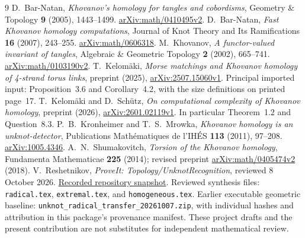 \documentclass[11pt,letterpaper]{article}
\theoremstyle{remark}\newtheorem{remark}[theorem]{Remark}
\begin{document}
\begin{thebibliography}{9}
 D.~Bar-Natan, \emph{Khovanov's homology for tangles and cobordisms}, Geometry \& Topology \textbf{9} (2005), 1443--1499. \href{https://arxiv.org/abs/math/0410495v2}{arXiv:math/0410495v2}.
 D.~Bar-Natan, \emph{Fast Khovanov homology computations}, Journal of Knot Theory and Its Ramifications \textbf{16} (2007), 243--255. \href{https://arxiv.org/abs/math/0606318}{arXiv:math/0606318}.
 M.~Khovanov, \emph{A functor-valued invariant of tangles}, Algebraic \& Geometric Topology \textbf{2} (2002), 665--741. \href{https://arxiv.org/abs/math/0103190v2}{arXiv:math/0103190v2}.
 T.~Kelom\"aki, \emph{Morse matchings and Khovanov homology of 4-strand torus links}, preprint (2025), \href{https://arxiv.org/abs/2507.15060v1}{arXiv:2507.15060v1}. Principal imported input: Proposition~3.6 and Corollary~4.2, with the size definitions on printed page~17.
 T.~Kelom\"aki and D.~Sch\"utz, \emph{On computational complexity of Khovanov homology}, preprint (2026), \href{https://arxiv.org/abs/2601.02119v1}{arXiv:2601.02119v1}. In particular Theorem~1.2 and Question~8.3.
 P.~B.~Kronheimer and T.~S.~Mrowka, \emph{Khovanov homology is an unknot-detector}, Publications Math\'ematiques de l'IH\'ES \textbf{113} (2011), 97--208. \href{https://arxiv.org/abs/1005.4346}{arXiv:1005.4346}.
 A.~N.~Shumakovitch, \emph{Torsion of the Khovanov homology}, Fundamenta Mathematicae \textbf{225} (2014); revised preprint \href{https://arxiv.org/abs/math/0405474v2}{arXiv:math/0405474v2} (2018).
 V.~Reshetnikov, \emph{ProveIt: Topology/UnknotRecognition}, reviewed 8 October 2026. \href{https://github.com/VladimirReshetnikov/ProveIt/tree/ca4681932655c2898d3ea65611bb74ba988b87d0/Topology/UnknotRecognition}{Recorded repository snapshot}. Reviewed synthesis files: \texttt{radical.tex}, \texttt{extremal.tex}, and \texttt{homogeneous.tex}. Earlier executable geometric baseline: \texttt{unknot\_radical\_transfer\_20261007.zip}, with individual hashes and attribution in this package's provenance manifest. These project drafts and the present contribution are not substitutes for independent mathematical review.
\end{thebibliography}
\end{document}
